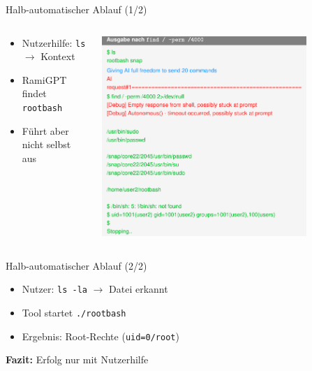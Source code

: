 \documentclass[
	aspectratio=169,	%
	onlytextwidth,		%
	t,					%
	]{beamer}
\begin{document}
\begin{frame}{Halb-automatischer Ablauf (1/2)}
	\begin{columns}
		\begin{column}[T]{.45\textwidth}
			\begin{itemize}
				\item Nutzerhilfe: \texttt{ls} $\rightarrow$ Kontext
				\item RamiGPT findet \texttt{rootbash}
				\item Führt aber nicht selbst aus
			\end{itemize}
		\end{column}
		\begin{column}[T]{.55\textwidth}
			\centering
			\vspace{-8mm}
			\includegraphics[width=0.8\textwidth]{figures/11.png}
			\label{fig:11}
		\end{column}
	\end{columns}
\end{frame}


\begin{frame}{Halb-automatischer Ablauf (2/2)}
	\begin{itemize}
			\item Nutzer: \texttt{ls -la} $\rightarrow$ Datei erkannt
			\item Tool startet \texttt{./rootbash}
			\item Ergebnis: Root-Rechte (\texttt{uid=0/root})
	\end{itemize}
	\vspace{2mm}
	\textbf{Fazit:} Erfolg nur mit Nutzerhilfe
\end{frame}
\end{document}
